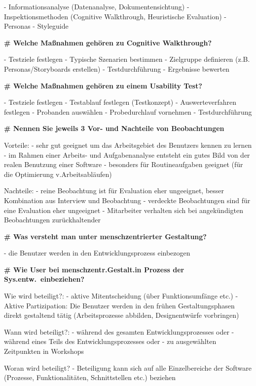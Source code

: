 \documentclass{article}
\begin{document}
\begin{multicols}{3}
\begin{flushleft}
\begin{tiny}
			- Informationsanalyse (Datenanalyse, Dokumentensichtung)
			- Inspektionsmethoden (Cognitive Walkthrough, Heuristische
			  Evaluation)
			- Personas
			- Styleguide

			\textbf{\# Welche Maßnahmen gehören zu Cognitive Walkthrough?}

			- Testziele festlegen
			- Typische Szenarien bestimmen
			- Zielgruppe definieren (z.B. Personas/Storyboards erstellen)
			- Testdurchführung
			- Ergebnisse bewerten

			\textbf{\# Welche Maßnahmen gehören zu einem Usability Test?}

			- Testziele festlegen
			- Testablauf festlegen (Testkonzept)
			- Auswerteverfahren festlegen
			- Probanden auswählen
			- Probedurchlauf vornehmen
			- Testdurchführung

			\textbf{\# Nennen Sie jeweils 3 Vor- und Nachteile von
				Beobachtungen}

			Vorteile:
			- sehr gut geeignet um das Arbeitsgebiet des Benutzers kennen zu
			  lernen
			- im Rahmen einer Arbeits- und Aufgabenanalyse entsteht ein gutes
			  Bild von der realen Benutzung einer Software
			- besonders für Routineaufgaben geeignet (für die Optimierung
			  v.Arbeitsabläufen)

			Nachteile:
			- reine Beobachtung ist für Evaluation eher ungeeignet, besser
			  Kombination aus Interview und Beobachtung 
			- verdeckte Beobachtungen sind für eine Evaluation eher ungeeignet
			- Mitarbeiter verhalten sich bei angekündigten Beobachtungen
			  zurückhaltender

			\textbf{\# Was versteht man unter menschzentrierter Gestaltung?}

			- die Benutzer werden in den Entwicklungsprozess einbezogen

			\textbf{\# Wie User bei menschzentr.Gestalt.in Prozess der
				Sys.entw.\ einbeziehen?}

			Wie wird beteiligt?:
			- aktive Mitentscheidung (über Funktionsumfänge etc.)
			- Aktive Partizipation: Die Benutzer werden in den frühen
			  Gestaltungsphasen direkt gestaltend tätig (Arbeitsprozesse
			  abbilden, Designentwürfe vorbringen)

			Wann wird beteiligt?:
			- während des gesamten Entwicklungsprozesses oder
			- während eines Teils des Entwicklungsprozesses oder
			- zu ausgewählten Zeitpunkten in Workshops

			Woran wird beteiligt?
			- Beteiligung kann sich auf alle Einzelbereiche der Software
			  (Prozesse, Funktionalitäten, Schnittstellen etc.) beziehen


\end{tiny}
\end{flushleft}
\end{multicols}
\end{document}
